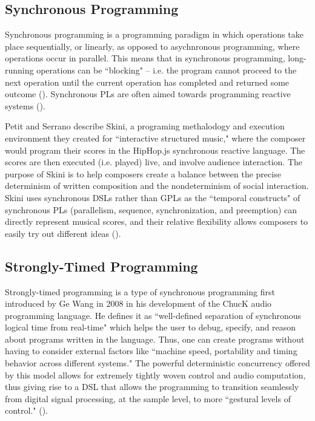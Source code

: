 \documentclass{report}
\newcommand\citeparen[1]{(\cite{#1})}
\begin{document}
\subsection{Synchronous Programming}
Synchronous  programming is a programming paradigm in which operations take  place  sequentially, or linearly, as opposed to asychnronous programming,  where operations  occur in parallel. This means that in synchronous programming, long-running operations can be ``blocking" -- i.e. the program cannot proceed to the next operation until the current operation has completed and returned some outcome \citeparen{deepsource}. Synchronous PLs are often aimed towards programming reactive systems \citeparen{petit_serrano_2020}.

Petit and Serrano describe Skini, a programing methalodogy and execution environment  they created  for ``interactive structured music," where the composer would  program their scores in the HipHop.js synchronous reactive  language. The scores are then executed (i.e.  played) live, and  involve audience interaction. The purpose of Skini is to help composers create  a balance  between the  precise determinism of written composition and the nondeterminism of social interaction. Skini uses synchronous DSLs rather than GPLs as the ``temporal constructs" of synchronous PLs (parallelism, sequence, synchronization, and preemption) can directly represent musical scores, and their relative flexibility allows  composers to easily try  out different ideas \citeparen{petit_serrano_2020}.

\subsection{Strongly-Timed Programming}
Strongly-timed programming is a type of synchronous programming first introduced by Ge Wang in 2008 in his development of the ChucK audio programming language. He defines it as ``well-defined separation of synchronous logical time from real-time" which helps the user to debug, specify, and reason about programs  written in the language. Thus, one can create  programs without having to consider external  factors like ``machine speed, portability and timing behavior across different systems." The powerful deterministic  concurrency offered by this  model allows for extremely tightly woven control and audio computation, thus giving rise to a DSL that allows the programming to transition seamlessly from digital signal processing, at the sample level, to more ``gestural levels of control." \citeparen{wang_2008}.
\end{document}
